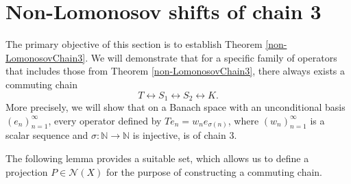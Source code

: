 \documentclass[a4paper,12pt]{article}
\theoremstyle{definition}
\numberwithin{equation}{section}
\numberwithin{thm}{section}
\newcommand{\N}{\mathbb{N}}
\begin{document}
\section{Non-Lomonosov shifts of chain 3}
\label{sec:non-lomonosov_shifts}

The primary objective of this section is to establish Theorem \ref{non-LomonosovChain3}. We will demonstrate that for a specific family of operators that includes those from Theorem \ref{non-LomonosovChain3}, there always exists a commuting chain
$$T \leftrightarrow S_1 \leftrightarrow S_2 \leftrightarrow K.$$
More precisely, we will show that on a Banach space with an unconditional basis $(e_n)_{n=1}^\infty$, every operator defined by $Te_n = w_n e_{\sigma(n)}$, where $(w_n)_{n=1}^\infty$ is a scalar sequence and $\sigma : \N \rightarrow \N$ is injective, is of chain $3$.

The following lemma provides a suitable set, which allows us to define a projection $P\in \mathcal{N}(X)$ for the purpose of constructing a commuting chain.
\end{document}
